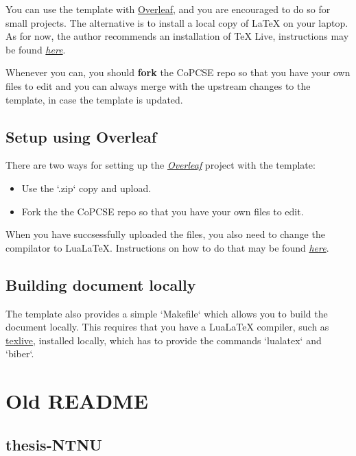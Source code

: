 \documentclass[../thesis.tex]{subfiles}
\begin{document}
You can use the template with \href{http://overleaf.com}{Overleaf}, and you are encouraged to do so for small projects. The alternative is to install a local copy of LaTeX on your laptop. As for now, the author recommends an installation of TeX Live, instructions may be found \href{https://www.tug.org/texlive/quickinstall.html}{\textit{here}}.

Whenever you can, you should \textbf{fork} the CoPCSE repo so that you have your own files to edit and you can always merge with the upstream changes to the template, in case the template is updated. 

\subsection{Setup using Overleaf}

There are two ways for setting up the \href{http://overleaf.com}{\textit{Overleaf}} project with the template:

\begin{itemize}
    \item Use the `.zip` copy and upload.
    \item Fork the the CoPCSE repo so that you have your own files to edit.
\end{itemize}

When you have succsessfully uploaded the files, you also need to change the compilator to LuaLaTeX. Instructions on how to do that may be found \href{https://www.overleaf.com/learn/how-to/Changing_compiler}{\textit{here}}.

\subsection{Building document locally}

The template also provides a simple `Makefile` which allows you to build the document locally. This requires that you have a LuaLaTeX compiler, such as \href{https://www.tug.org/texlive/}{texlive}, installed locally, which has to provide the commands `lualatex` and `biber`.


\section{Old README}

\subsection{thesis-NTNU}
\end{document}
